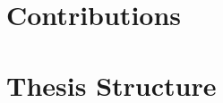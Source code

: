 \section{Contributions}
\label{sec:introContributions}

\begin{comment}
This section just provides a brief summary of the main contributions of the work.
The main description of the contributions will come in Section~\ref{sec:contributions}, after the results are presented.
(Hence Section~\ref{sec:introContributions} can also be left out, leaving the discussion completely to Section~\ref{sec:contributions}.)

The format of this section will generally be as follows:

\begin{enumerate}
    \item \textit{Lorem ipsum dolor sit amet, consectetur adipiscing elit.}
    \item \textit{Lorem ipsum dolor sit amet, consectetur adipiscing elit.}
    \item \textit{Lorem ipsum dolor sit amet, consectetur adipiscing elit.}
\end{enumerate}

\noindent
where the items on the list briefly describe the key contributions.

The order of the contributions here is important. List your main contribution first!
Creating this list will help you not only with writing the Conclusion (where all items listed here definitely should be included, and in more detail),
but also with items that need to be mentioned in the Abstract, as well as with points that you will want to bring to attention in the Discussion.
Hence most of the content on this list will be addressed 4--5 times in your text: here, in the Abstract, Discussion, Conclusion, and (most likely)
in the Results chapter.
\end{comment}

\section{Thesis Structure}
\label{sec:thesisStructure}

\begin{comment}
This section provides the reader with an overview of what is coming in the next chapters.
You want to say more than what is explicit in the chapter name, if possible, but still keep the description short and to the point. So something along the lines of:

\begin{itemize}
    \item Chapter~\ref{cha:background_theory} introduces the theory, tools and methods necessary to understand the work.
    \item \textit{Lorem ipsum dolor sit amet, consectetur adipiscing elit.}
    \item Chapter~\ref{cha:conclusion} sums up the work and points to ways it can be improved or extended in the future.
\end{itemize}
\end{comment}

\glsresetall